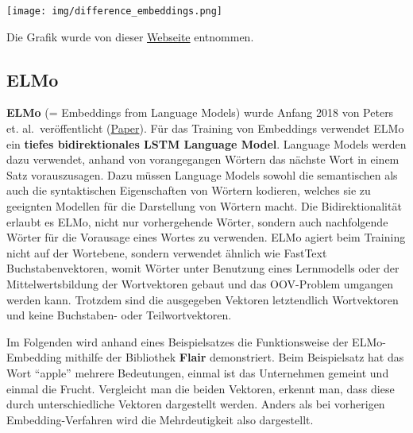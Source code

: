 \documentclass[11pt]{article}
\begin{document}
\texttt{[image: img/difference\_embeddings.png]}

Die Grafik wurde von dieser
\href{https://www.quora.com/What-were-the-most-significant-Natural-Language-Processing-advances-in-2018/answer/Ajit-Rajasekharan}{Webseite}
entnommen.

    \hypertarget{elmo}{%
\subsection{ELMo}\label{elmo}}

\textbf{ELMo} (= Embeddings from Language Models) wurde Anfang 2018 von
Peters et. al.~veröffentlicht
(\href{https://arxiv.org/abs/1802.05365}{Paper}). Für das Training von
Embeddings verwendet ELMo ein \textbf{tiefes bidirektionales LSTM
Language Model}. Language Models werden dazu verwendet, anhand von
vorangegangen Wörtern das nächste Wort in einem Satz vorauszusagen. Dazu
müssen Language Models sowohl die semantischen als auch die
syntaktischen Eigenschaften von Wörtern kodieren, welches sie zu
geeignten Modellen für die Darstellung von Wörtern macht. Die
Bidirektionalität erlaubt es ELMo, nicht nur vorhergehende Wörter,
sondern auch nachfolgende Wörter für die Vorausage eines Wortes zu
verwenden. ELMo agiert beim Training nicht auf der Wortebene, sondern
verwendet ähnlich wie FastText Buchstabenvektoren, womit Wörter unter
Benutzung eines Lernmodells oder der Mittelwertsbildung der Wortvektoren
gebaut und das OOV-Problem umgangen werden kann. Trotzdem sind die
ausgegeben Vektoren letztendlich Wortvektoren und keine Buchstaben- oder
Teilwortvektoren.

Im Folgenden wird anhand eines Beispielsatzes die Funktionsweise der
ELMo-Embedding mithilfe der Bibliothek \textbf{Flair} demonstriert. Beim
Beispielsatz hat das Wort ``apple'' mehrere Bedeutungen, einmal ist das
Unternehmen gemeint und einmal die Frucht. Vergleicht man die beiden
Vektoren, erkennt man, dass diese durch unterschiedliche Vektoren
dargestellt werden. Anders als bei vorherigen Embedding-Verfahren wird
die Mehrdeutigkeit also dargestellt.
\end{document}
